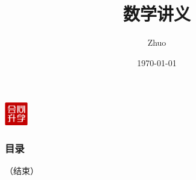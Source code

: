 \documentclass{beamer}
\title[]{数学讲义}
\author{Zhuo}
\institute[] %
{
}
\date{\today}
\begin{document}
	\begin{frame}
		\vspace{-1cm}
		\begin{flushleft}
			\includegraphics[width=1cm]{./pics/huixin_logo.png}
		\end{flushleft}
		\titlepage
	\end{frame}

	\begin{frame}
		\frametitle{目录}
		\tableofcontents %
	\end{frame}
	
	
	
	
		
	\begin{frame}
		\Huge{\centerline{（结束）}}
	\end{frame}
	
	
	
		
\end{document}
